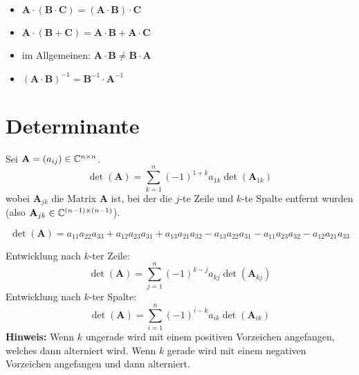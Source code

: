 \begin{itemize}
	\item $\mathbf{A} \cdot (\mathbf{B} \cdot \mathbf{C}) = (\mathbf{A} \cdot \mathbf{B}) \cdot \mathbf{C}$
	
	\item $\mathbf{A} \cdot (\mathbf{B} + \mathbf{C}) = \mathbf{A} \cdot \mathbf{B} + \mathbf{A} \cdot \mathbf{C}$
	
	\item im Allgemeinen: $\mathbf{A} \cdot \mathbf{B} \neq \mathbf{B} \cdot \mathbf{A}$
	
	\item $(\mathbf{A} \cdot \mathbf{B})^{-1} = \mathbf{B}^{-1} \cdot \mathbf{A}^{-1}$
	
\end{itemize}

\section{Determinante}

\begin{frameddefn}
	Sei $\mathbf{A} = (a_{ij}) \in \mathbb{C}^{n\times n}$.
	\[
	\det(\mathbf{A}) = \sum_{k=1}^{n} (-1)^{1+k} a_{1k} \det(\mathbf{A}_{1k})
	\]
	wobei $\mathbf{A}_{jk}$ die Matrix $\mathbf{A}$ ist, bei der die $j$-te Zeile und $k$-te Spalte entfernt wurden (also $\mathbf{A}_{jk} \in \mathbb{C}^{(n-1) \times (n-1)}$).
\end{frameddefn}

\begin{framedthm}
	\[
	\det(\mathbf{A}) = a_{11} a_{22} a_{33} + a_{12} a_{23} a_{31} + a_{13} a_{21} a_{32} - a_{13} a_{22} a_{31} - a_{11} a_{23} a_{32} - a_{12} a_{21} a_{33}
	\]
\end{framedthm}


\begin{framedprop}
	Entwicklung nach $k$-ter Zeile:
	\[
	\det(\mathbf{A}) = \sum_{j=1}^{n} (-1)^{k-j} a_{kj} \det(\mathbf{A}_{kj})
	\]
	Entwicklung nach $k$-ter Spalte:
	\[
	\det(\mathbf{A}) = \sum_{i=1}^{n} (-1)^{i-k} a_{ik} \det(\mathbf{A}_{ik})
	\]
	\textbf{Hinweis:} Wenn $k$ ungerade wird mit einem positiven Vorzeichen angefangen, welches dann alterniert wird. Wenn $k$ gerade wird mit einem negativen Vorzeichen angefangen und dann alterniert.
\end{framedprop}

